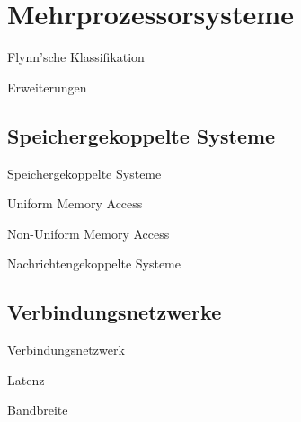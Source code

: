 \section{Mehrprozessorsysteme}

\begin{defi}{Flynn'sche Klassifikation}

\end{defi}

\begin{bonus}{Erweiterungen}

\end{bonus}

\subsection{Speichergekoppelte Systeme}

\begin{defi}{Speichergekoppelte Systeme}

\end{defi}

\begin{defi}{Uniform Memory Access}

\end{defi}

\begin{defi}{Non-Uniform Memory Access}

\end{defi}

\begin{defi}{Nachrichtengekoppelte Systeme}

\end{defi}

\subsection{Verbindungsnetzwerke}

\begin{defi}{Verbindungsnetzwerk}

\end{defi}

\begin{defi}[Verbindungsnetzwerk]{Latenz}

\end{defi}

\begin{defi}[Verbindungsnetzwerk]{Bandbreite}

\end{defi}

